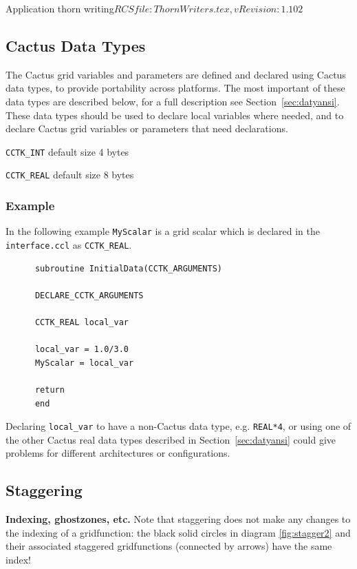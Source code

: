 \begin{cactuspart}{2}{Application thorn writing}{$RCSfile: ThornWriters.tex,v $}{$Revision: 1.102 $}
\subsection{Cactus Data Types}

The Cactus grid variables and parameters are defined and
declared using Cactus data types, to provide portability
across platforms. The most important of
these data types are described below, for a full description
see Section~\ref{sec:datyansi}. These data types should
be used to declare local variables where needed, and to
declare Cactus grid variables or parameters that need
declarations.

\begin{Lentry}

\item[{\tt CCTK\_INT}] default size 4 bytes
\item[{\tt CCTK\_REAL}] default size 8 bytes

\end{Lentry}

\subsubsection{Example}

In the following example {\tt MyScalar} is a grid scalar which
is declared in the {\tt interface.ccl} as {\tt CCTK\_REAL}.

\begin{verbatim}
      subroutine InitialData(CCTK_ARGUMENTS)

      DECLARE_CCTK_ARGUMENTS

      CCTK_REAL local_var

      local_var = 1.0/3.0
      MyScalar = local_var

      return
      end
\end{verbatim}

Declaring {\tt local\_var} to have a non-Cactus data type, e.g.
{\tt REAL*4}, or using one of the other Cactus real data types
described in Section~\ref{sec:datyansi} could give problems for
different architectures or configurations.

\subsection{Staggering}
\label{sec:st}

{\bf Indexing, ghostzones, etc.}
Note that staggering does not make any changes to the indexing of a
gridfunction: the black solid circles in diagram \ref{fig:stagger2} and their
associated staggered gridfunctions (connected by arrows) have the same index!


\end{cactuspart}
